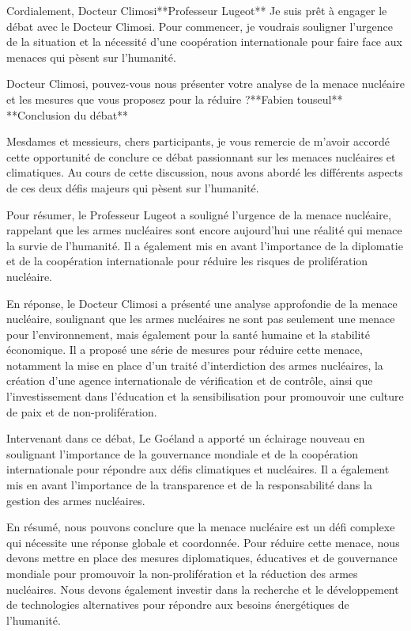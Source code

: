 Cordialement,
Docteur Climosi**Professeur Lugeot**
Je suis prêt à engager le débat avec le Docteur Climosi. Pour commencer, je voudrais souligner l'urgence de la situation et la nécessité d'une coopération internationale pour faire face aux menaces qui pèsent sur l'humanité.

Docteur Climosi, pouvez-vous nous présenter votre analyse de la menace nucléaire et les mesures que vous proposez pour la réduire ?**Fabien touseul**
**Conclusion du débat**

Mesdames et messieurs, chers participants, je vous remercie de m'avoir accordé cette opportunité de conclure ce débat passionnant sur les menaces nucléaires et climatiques. Au cours de cette discussion, nous avons abordé les différents aspects de ces deux défis majeurs qui pèsent sur l'humanité.

Pour résumer, le Professeur Lugeot a souligné l'urgence de la menace nucléaire, rappelant que les armes nucléaires sont encore aujourd'hui une réalité qui menace la survie de l'humanité. Il a également mis en avant l'importance de la diplomatie et de la coopération internationale pour réduire les risques de prolifération nucléaire.

En réponse, le Docteur Climosi a présenté une analyse approfondie de la menace nucléaire, soulignant que les armes nucléaires ne sont pas seulement une menace pour l'environnement, mais également pour la santé humaine et la stabilité économique. Il a proposé une série de mesures pour réduire cette menace, notamment la mise en place d'un traité d'interdiction des armes nucléaires, la création d'une agence internationale de vérification et de contrôle, ainsi que l'investissement dans l'éducation et la sensibilisation pour promouvoir une culture de paix et de non-prolifération.

Intervenant dans ce débat, Le Goéland a apporté un éclairage nouveau en soulignant l'importance de la gouvernance mondiale et de la coopération internationale pour répondre aux défis climatiques et nucléaires. Il a également mis en avant l'importance de la transparence et de la responsabilité dans la gestion des armes nucléaires.

En résumé, nous pouvons conclure que la menace nucléaire est un défi complexe qui nécessite une réponse globale et coordonnée. Pour réduire cette menace, nous devons mettre en place des mesures diplomatiques, éducatives et de gouvernance mondiale pour promouvoir la non-prolifération et la réduction des armes nucléaires. Nous devons également investir dans la recherche et le développement de technologies alternatives pour répondre aux besoins énergétiques de l'humanité.

